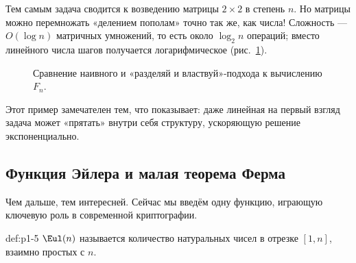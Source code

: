 \begin{importantbox}
Тем самым задача сводится к возведению матрицы $2{\times}2$ в степень $n$. Но матрицы можно перемножать «делением пополам» точно так же, как числа! Сложность --- $O(\log n)$ матричных умножений, то есть около $\log_2 n$ операций; вместо линейного числа шагов получается логарифмическое (рис.~\ref{fig:p1-3}).
\end{importantbox}

\begin{figure}[H]
\centering
{}
\caption{Сравнение наивного и «разделяй и властвуй»-подхода к вычислению $F_n$.}
\label{fig:p1-3}
\end{figure}

Этот пример замечателен тем, что показывает: даже линейная на первый взгляд задача может «прятать» внутри себя структуру, ускоряющую решение экспоненциально.

\subsection{Функция Эйлера и малая теорема Ферма}

Чем дальше, тем интересней. Сейчас мы введём одну функцию, играющую ключевую роль в современной криптографии.

\begin{definition}{}{def:p1-5}
 $\Eul(n)$ называется количество натуральных чисел в отрезке $[1, n]$, взаимно простых с $n$.
\end{definition}

